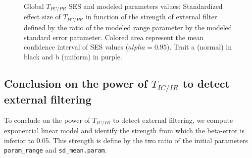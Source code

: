 \documentclass[12pt]{article}\usepackage[]{graphicx}\usepackage[]{color}
\newenvironment{knitrout}{}{} %
\begin{document}
\begin{knitrout}
\begin{figure}
{}

\caption[Global $T_{PC/PR}$ SES and modeled parameters values]{Global $T_{PC/PR}$ SES and modeled parameters values: Standardized effect size of $T_{PC/PR}$ in function of the strength of external filter defined by the ratio of the modeled range parameter by the modeled standard error parameter. Colored area represent the mean confidence interval of SES values ($alpha = 0.95$). Trait a (normal) in black and b (uniform) in purple.}\label{fig:External_filter_Results_plots_modeled_param2}
\end{figure}


\end{knitrout}


  \subsection {Conclusion on the power of $T_{IC/IR}$ to detect external filtering}

To conclude on the power of $T_{IC/IR}$ to detect external filtering, we compute exponential linear model and identify the strength from which the beta-error is inferior to 0.05. This strength is define by the two ratio of the initial parameters \texttt{param\_range} and \texttt{sd\_mean.param}. 
\end{document}
